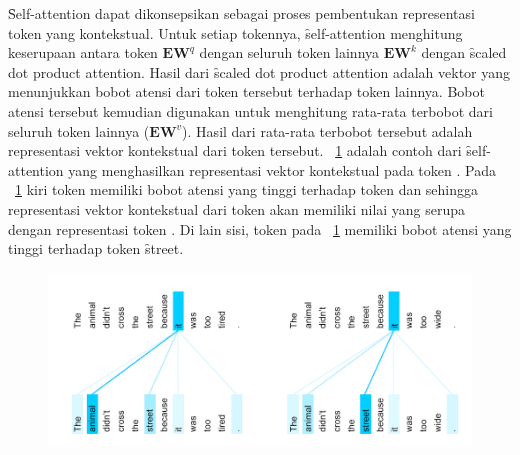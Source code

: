 	\f{Self-attention} dapat dikonsepsikan sebagai proses pembentukan representasi token yang kontekstual. Untuk setiap tokennya, \f{self-attention} menghitung keserupaan antara token $\mathbf{E}\mathbf{W}^q$ dengan seluruh token lainnya $\mathbf{E} \mathbf{W}^k$ dengan \f{scaled dot product attention}. Hasil dari \f{scaled dot product attention} adalah vektor yang menunjukkan bobot atensi dari token tersebut terhadap token lainnya. Bobot atensi tersebut kemudian digunakan untuk menghitung rata-rata terbobot dari seluruh token lainnya ($\mathbf{E} \mathbf{W}^v$). Hasil dari rata-rata terbobot tersebut adalah representasi vektor kontekstual dari token tersebut. \pic~\ref{fig:self-attention-example} adalah contoh dari \f{self-attention} yang menghasilkan representasi vektor kontekstual pada token . Pada \pic~\ref{fig:self-attention-example} kiri token  memiliki bobot atensi yang tinggi terhadap token dan  sehingga representasi vektor kontekstual dari token  akan memiliki nilai yang serupa dengan representasi token . Di lain sisi, token  pada \pic~\ref{fig:self-attention-example} memiliki bobot atensi yang tinggi terhadap token \f{street}.
	\begin{figure}[!ht]
		\centering
		\includegraphics[width=1\textwidth]{assets/pics/self-attn-example.png}
		\label{fig:self-attention-example}
	\end{figure}
	
